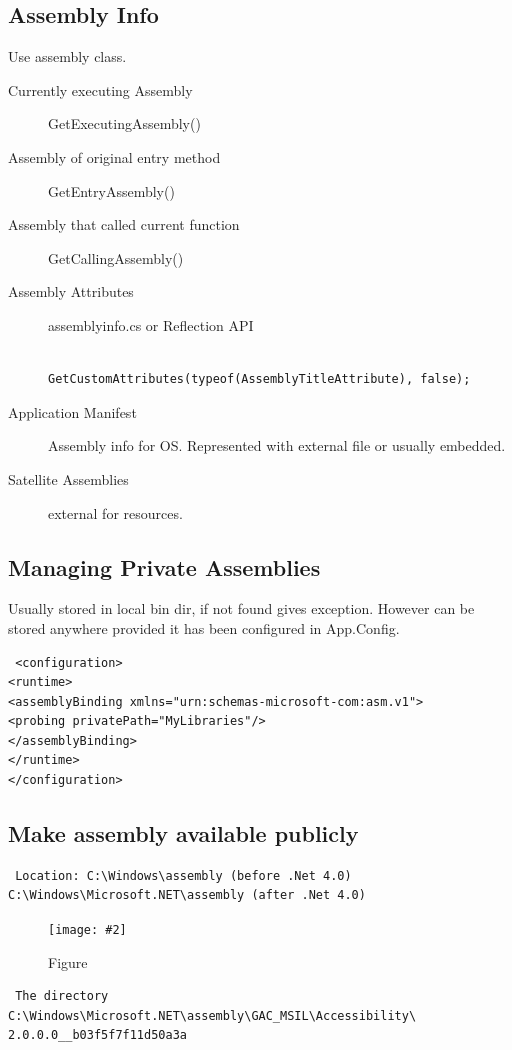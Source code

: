 \documentclass[a4paper,10pt]{scrartcl}
\newcommand{\pic}[2][Figure]{
  \begin{figure}[h!]
   \centering
   \texttt{[image: \#2]}
   \caption{{#1}}
  \end{figure}
}
\begin{document}
\subsection{Assembly Info}
Use assembly class. 
\begin{description}
 \item [Currently executing Assembly] GetExecutingAssembly()
 \item [Assembly of original entry method] GetEntryAssembly()
  \item [Assembly that called current function] GetCallingAssembly()
  \item [Assembly Attributes] assemblyinfo.cs or Reflection API \begin{lstlisting}
                                                                 GetCustomAttributes(typeof(AssemblyTitleAttribute), false);

                                                                \end{lstlisting}
  \item[Application Manifest] Assembly info for OS. Represented with external file or usually embedded.
  \item [Satellite Assemblies] external for resources.
  

\end{description}

\subsection{Managing Private Assemblies}
Usually stored in local bin dir, if not found gives exception. However can be stored anywhere provided it has been configured in App.Config.
\begin{lstlisting}
 <configuration>
<runtime>
<assemblyBinding xmlns="urn:schemas-microsoft-com:asm.v1">
<probing privatePath="MyLibraries"/>
</assemblyBinding>
</runtime>
</configuration>

\end{lstlisting}


\subsection{Make assembly available publicly}
\begin{verbatim}
 Location: C:\Windows\assembly (before .Net 4.0)
C:\Windows\Microsoft.NET\assembly (after .Net 4.0)

\end{verbatim}
\pic{gacinstall.png}
\begin{verbatim}
 The directory
C:\Windows\Microsoft.NET\assembly\GAC_MSIL\Accessibility\
2.0.0.0__b03f5f7f11d50a3a
\end{verbatim}
\end{document}
